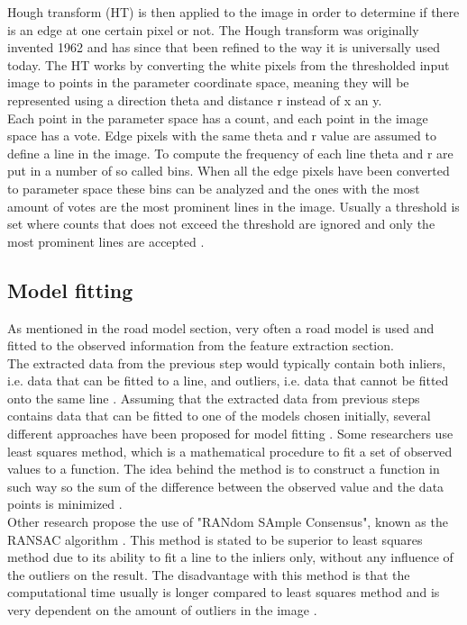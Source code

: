 Hough transform (HT) is then applied to the image in order to determine if there is an edge at one certain pixel or not. The Hough transform was originally invented 1962 and has since that been refined to the way it is universally used today. The HT works by converting the white pixels from the thresholded input image to points in the parameter coordinate space, meaning they will be represented using a direction theta and distance r instead of x an y.\\

Each point in the parameter space has a count, and each point in the image space has a vote. Edge pixels with the same theta and r value are assumed to define a line in the image. To compute the frequency of each line theta and r are put in a number of so called bins.  When all the edge pixels have been converted to parameter space these bins can be analyzed and the ones with the most amount of votes are the most prominent lines in the image. Usually a threshold is set where counts that does not exceed the threshold are ignored and only the most prominent lines are accepted \cite{davies}.


\subsection{Model fitting}
As mentioned in the road model section, very often a road model is used and fitted to the observed information from the feature extraction section.\\

The extracted data from the previous step would typically contain both inliers, i.e. data that can be fitted to a line, and outliers, i.e. data that cannot be fitted onto the same line \cite{raguram2008comparative}. Assuming that the extracted data from previous steps contains data that can be fitted to one of the models chosen initially, several different approaches have been proposed for model fitting \cite{BarHillel2014}. Some researchers use least squares method, which is a mathematical procedure to fit a set of observed values to a function. The idea behind the method is to construct a function in such way so the sum of the difference between the observed value and the data points is minimized \cite{LS}.\\

Other research propose the use of "RANdom SAmple Consensus", known as the RANSAC algorithm \cite{huang2009finding}\cite{aly2008real} \cite{li2013lane}. This method is stated to be superior to least squares method due to its ability to fit a line to the inliers only, without any influence of the outliers on the result. The disadvantage with this method is that the computational time usually is longer compared to least squares method and is very dependent on the amount of outliers in the image \cite{RANSAC}.


